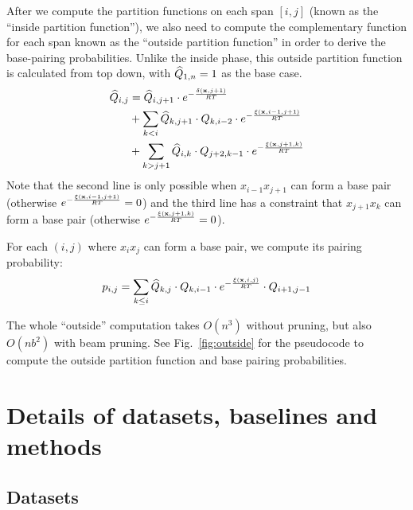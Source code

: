 After we compute the partition functions  on each span $[i,j]$ (known as the ``inside partition function''),
we also need to compute the complementary function  for each span known as
the ``outside partition function'' in order to derive the base-pairing probabilities. 
Unlike the inside phase, this outside partition function is calculated from top down,
with $\widehat{Q}_{{{1}}, {{n}}} = 1$ as the base case.
\begin{equation*}
\begin{split}
\widehat{Q}_{{{i}}, {{j}}} & = \widehat{Q}_{{{i}}, {{j+1}}} \cdot e^{-\frac{\delta(\mathbf{x}, j+1)}{RT}} \\
                  & + \sum_{k < i} \widehat{Q}_{{{k}}, {{j+1}}} \cdot Q_{{{k}}, {{i-2}}} \cdot e^{-\frac{\xi(\mathbf{x},i-1,j+1)}{RT}} \\
                  & + \sum_{k > j+1} \widehat{Q}_{{{i}}, {{k}}} \cdot Q_{{{j+2}}, {{k-1}}} \cdot e^{-\frac{\xi(\mathbf{x},j+1,k)}{RT}}
\end{split}
\end{equation*}
Note that the second line is only possible when $x_{i-1} x_{j+1}$ can form a base pair
(otherwise $e^{-\frac{\xi(\mathbf{x},i-1,j+1)}{RT}} = 0$)
and the third line has a constraint that $x_{j+1}x_k$ can form a base pair 
(otherwise $e^{-\frac{\xi(\mathbf{x},j+1,k)}{RT}} = 0$).


For each $(i,j)$  where $x_i x_j$ can form a base pair, we compute its pairing probability:
\[
p_{i,j}  = \sum_{k \leq i} \widehat{Q}_{{{k}}, {{j}}} \cdot Q_{{{k}}, {{i-1}}} \cdot e^{-\frac{\xi(\mathbf{x},i,j)}{RT}} \cdot Q_{{{i+1}}, {{j-1}}}
\]

The whole ``outside'' computation takes $O(n^3)$ without pruning,
but also $O(nb^2)$ with beam pruning.
See Fig.~\ref{fig:outside} for the pseudocode to compute the outside partition function and base pairing probabilities.


\section{Details of datasets, baselines and methods}

\subsection{Datasets}
\label{sec:datasets}

